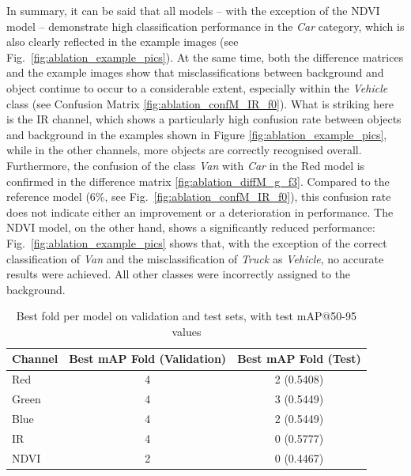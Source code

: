 In summary, it can be said that all models – with the exception of the NDVI model – demonstrate high classification performance in the \textit{Car} category, which is also clearly reflected in the example images (see Fig.~\ref{fig:ablation_example_pics}). At the same time, both the difference matrices and the example images show that misclassifications between background and object continue to occur to a considerable extent, especially within the \textit{Vehicle} class (see Confusion Matrix \ref{fig:ablation_confM_IR_f0}). What is striking here is the IR channel, which shows a particularly high confusion rate between objects and background in the examples shown in Figure \ref{fig:ablation_example_pics}, while in the other channels, more objects are correctly recognised overall. Furthermore, the confusion of the class \textit{Van} with \textit{Car} in the Red model is confirmed in the difference matrix \ref{fig:ablation_diffM_g_f3}. Compared to the reference model (6\%, see Fig.~\ref{fig:ablation_confM_IR_f0}), this confusion rate does not indicate either an improvement or a deterioration in performance. The NDVI model, on the other hand, shows a significantly reduced performance: Fig.~\ref{fig:ablation_example_pics} shows that, with the exception of the correct classification of \textit{Van} and the misclassification of \textit{Truck} as \textit{Vehicle}, no accurate results were achieved. All other classes were incorrectly assigned to the background.






\begin{table}[h]
\centering
\begin{tabular}{l c c}
\hline
\textbf{Channel} & \textbf{Best mAP Fold (Validation)} & \textbf{Best mAP Fold (Test)} \\ 
\hline
Red   & 4 & 2 (0.5408) \\
Green & 4 & 3 (0.5449) \\
Blue  & 4 & 2 (0.5449) \\
IR    & 4 & 0 (0.5777) \\
NDVI  & 2 & 0 (0.4467) \\
\hline
\end{tabular}
\caption{Best fold per model on validation and test sets, with test mAP@50-95 values}
\label{tab:ablation_best_folds_test}
\end{table}





